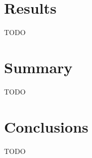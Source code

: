 \documentclass[final]{ieee}
\begin{document}







\section{Results}
TODO
            
\section{Summary}
TODO
\section{Conclusions}
TODO
           
\end{document}
